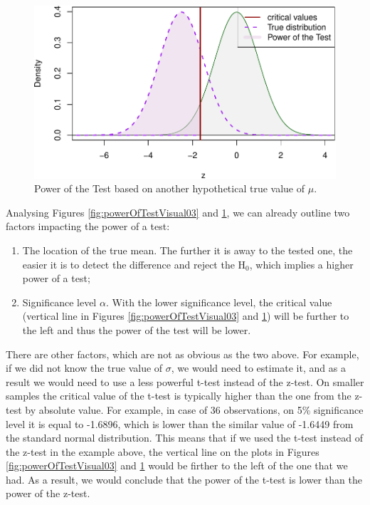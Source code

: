 \documentclass[
]{book}
\providecommand{\tightlist}{%
  \setlength{\itemsep}{0pt}\setlength{\parskip}{0pt}}
\theoremstyle{definition}
\theoremstyle{definition}
\theoremstyle{definition}
\theoremstyle{definition}
\theoremstyle{remark}
\begin{document}
\begin{figure}
\centering
\includegraphics{Svetunkov---Statistics-for-Business-Analytics_files/figure-latex/powerOfTestVisual04-1.pdf}
\caption{\label{fig:powerOfTestVisual04}Power of the Test based on another hypothetical true value of \(\mu\).}
\end{figure}

Analysing Figures \ref{fig:powerOfTestVisual03} and \ref{fig:powerOfTestVisual04}, we can already outline two factors impacting the power of a test:

\begin{enumerate}
\def\labelenumi{\arabic{enumi}.}
\tightlist
\item
  The location of the true mean. The further it is away to the tested one, the easier it is to detect the difference and reject the H\(_0\), which implies a higher power of a test;
\item
  Significance level \(\alpha\). With the lower significance level, the critical value (vertical line in Figures \ref{fig:powerOfTestVisual03} and \ref{fig:powerOfTestVisual04}) will be further to the left and thus the power of the test will be lower.
\end{enumerate}

There are other factors, which are not as obvious as the two above. For example, if we did not know the true value of \(\sigma\), we would need to estimate it, and as a result we would need to use a less powerful t-test instead of the z-test. On smaller samples the critical value of the t-test is typically higher than the one from the z-test by absolute value. For example, in case of 36 observations, on 5\% significance level it is equal to -1.6896, which is lower than the similar value of -1.6449 from the standard normal distribution. This means that if we used the t-test instead of the z-test in the example above, the vertical line on the plots in Figures \ref{fig:powerOfTestVisual03} and \ref{fig:powerOfTestVisual04} would be firther to the left of the one that we had. As a result, we would conclude that the power of the t-test is lower than the power of the z-test.
\end{document}
